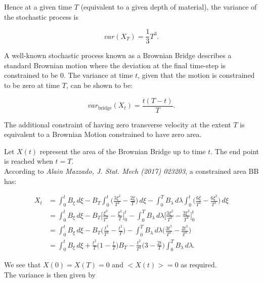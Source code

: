 \documentclass{article}
\numberwithin{equation}{section}
\begin{document}
Hence at a given time $T$ (equivalent to a given depth of material), the variance of the stochastic process is

\begin{equation}
    var(X_T) = \frac{1}{3}T^3.
\end{equation}

A well-known stochastic process known as a Brownian Bridge describes a standard Brownian motion where the deviation at the final time-step is constrained to be 0. The variance at time $t$, given that the motion is constrained to be zero at time $T$, can be shown to be:

\begin{equation}
    var_{\text{bridge}}(X_t) = \frac{t(T-t)}{T}.
\end{equation}

The additional constraint of having zero transverse velocity at the extent $T$ is equivalent to a Brownian Motion constrained to have zero area.

Let $X(t)$ represent the area of the Brownian Bridge up to time $t$. The end point is reached when $t=T$.
\\
\vspace{0.2in}
According to \textit{Alain Mazzado, J. Stat. Mech (2017) 023203}, a constrained area BB has:

\begin{equation}
  \begin{aligned}
    X_t &= \int_0^t B_{\xi}\,d\xi - B_T\int_0^t \bigg(\frac{3\xi^2}{T^2} - \frac{2\xi}{T}\bigg)\,d\xi - \int_0^T B_{\lambda}\,d\lambda \int_0^t \bigg(\frac{6\xi}{T^2}-\frac{6\xi^2}{T^3}\bigg)\,d\xi \\
    &= \int_0^t B_{\xi}\,d\xi - B_T\bigg[\frac{\xi^3}{T^2} - \frac{\xi^2}{T}\bigg]^t_0 - \int_0^T B_{\lambda}\,d\lambda \bigg[\frac{3\xi^2}{T^2} - \frac{2\xi^3}{T^3}\bigg]^t_0 \\
    &= \int_0^t B_{\xi}\,d\xi - B_T\bigg(\frac{t^3}{T^2} - \frac{t^2}{T}\bigg) - \int_0^T B_{\lambda}\,d\lambda \bigg(\frac{3t^2}{T^2} - \frac{2t^3}{T^3}\bigg) \\
    &= \int_0^t B_{\xi} \,d\xi + \frac{t^2}{T}\bigg(1 - \frac{t}{T}\bigg)B_T - \frac{t^2}{T^2}\bigg(3-\frac{2t}{T}\bigg)\int_0^T B_{\lambda}\,d\lambda.
  \end{aligned}
\end{equation}

We see that $X(0) = X(T) = 0$ and $\big<X(t)\big> = 0$ as required.
\\
\vspace{0.2in}
The variance is then given by
\end{document}
